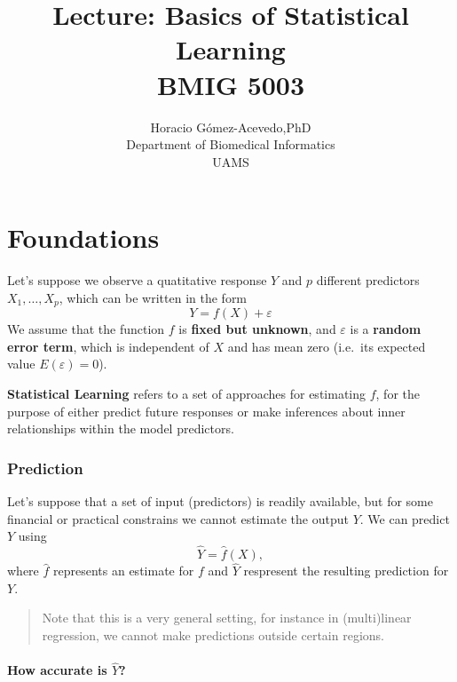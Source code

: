 \documentclass[11pt]{article}
\title{Lecture: Basics of Statistical Learning\\ BMIG 5003}
\author{Horacio G\'omez-Acevedo,PhD\\ Department of Biomedical Informatics\\UAMS}
\begin{document}
    
    
    \maketitle
    
    

    
    \hypertarget{statistical-learning}{%
\section{Foundations }\label{statistical-learning}}


  

    Let's suppose we observe a quatitative response \(Y\) and \(p\)
different predictors \(X_1,\ldots, X_p\), which can be written in the
form \begin{equation*}
Y= f(X) + \varepsilon
\end{equation*} We assume that the function \(f\) is \textbf{fixed but
unknown}, and \(\varepsilon\) is a \textbf{random error term}, which is
independent of \(X\) and has mean zero (i.e.~its expected value
\(E (\varepsilon) =0\)).

\textbf{Statistical Learning} refers to a set of approaches for
estimating \(f\), for the purpose of either predict future responses or
make inferences about inner relationships within the model predictors.

    \hypertarget{prediction}{%
\subsubsection{Prediction}\label{prediction}}

Let's suppose that a set of input (predictors) is readily available, but
for some financial or practical constrains we cannot estimate the output
\(Y\). We can predict \(Y\) using \begin{equation*}
\hat{Y} = \hat{f}(X),
\end{equation*} where \(\hat{f}\) represents an estimate for \(f\) and
\(\hat{Y}\) respresent the resulting prediction for \(Y\).

\begin{quote}
Note that this is a very general setting, for instance in (multi)linear
regression, we cannot make predictions outside certain regions.
\end{quote}

\hypertarget{how-accurate-is-haty}{%
\paragraph{\texorpdfstring{How accurate is
\(\hat{Y}\)?}{How accurate is \textbackslash{}hat\{Y\}?}}\label{how-accurate-is-haty}}
\end{document}
